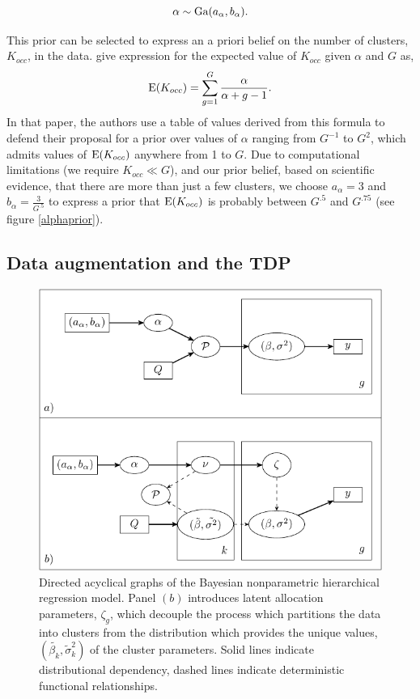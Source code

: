 {\begin{equation}
\alpha \sim \operatorname{Ga}(a_\alpha,b_\alpha).
\end{equation}

This prior can be selected to express an a priori belief on the number of clusters, $K_{occ}$, in the data. \citet{escobar1994} give expression for the expected value of $K_{occ}$ given $\alpha$ and $G$ as,
\begin{equation}
\operatorname{E}(K_{occ})=\sum_{g=1}^{G} \frac{\alpha}{\alpha + g - 1}.
\end{equation}
In that paper, the authors use a table of values derived from this formula to defend their proposal for a prior over values of $\alpha$ ranging from $G^{-1}$ to $G^{2}$, which admits values of $\operatorname{E}(K_{occ})$ anywhere from 1 to $G$. Due to computational limitations (we require $K_{occ} \ll G$), and our prior belief, based on scientific evidence, that there are more than just a few clusters, we choose $a_\alpha=3$ and $b_\alpha=\frac{3}{G^{.5}}$ to express a prior that $\operatorname{E}(K_{occ})$ is probably between $G^{.5}$ and $G^{.75}$ (see figure \ref{alphaprior}).

\subsection{Data augmentation and the TDP}
\label{subsec:reparam}

\begin{figure}
\includegraphics[width=.8\textwidth]{my_dag}
\caption{Directed acyclical graphs of the Bayesian nonparametric hierarchical regression model. Panel $(b)$ introduces latent allocation parameters, $\zeta_g$, which decouple the process which partitions the data into clusters from the distribution which provides the unique values, $(\tilde{\beta_k},\tilde{\sigma}_k^2)$ of the cluster parameters. Solid lines indicate distributional dependency, dashed lines indicate deterministic functional relationships.}
\label{dag}
\end{figure}

}
